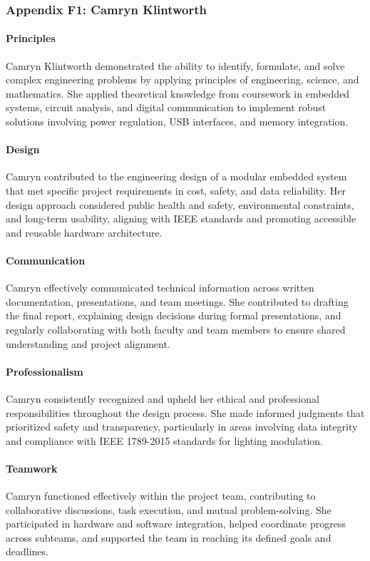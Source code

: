 \documentclass[../../main.tex]{subfiles}
\begin{document}
\subsubsection{Appendix F1: Camryn Klintworth}

\paragraph{Principles}
Camryn Klintworth demonstrated the ability to identify, formulate, and solve complex engineering problems by applying principles of engineering, science, and mathematics. She applied theoretical knowledge from coursework in embedded systems, circuit analysis, and digital communication to implement robust solutions involving power regulation, USB interfaces, and memory integration.

\paragraph{Design}
Camryn contributed to the engineering design of a modular embedded system that met specific project requirements in cost, safety, and data reliability. Her design approach considered public health and safety, environmental constraints, and long-term usability, aligning with IEEE standards and promoting accessible and reusable hardware architecture.

\paragraph{Communication}
Camryn effectively communicated technical information across written documentation, presentations, and team meetings. She contributed to drafting the final report, explaining design decisions during formal presentations, and regularly collaborating with both faculty and team members to ensure shared understanding and project alignment.

\paragraph{Professionalism}
Camryn consistently recognized and upheld her ethical and professional responsibilities throughout the design process. She made informed judgments that prioritized safety and transparency, particularly in areas involving data integrity and compliance with IEEE 1789-2015 standards for lighting modulation.

\paragraph{Teamwork}
Camryn functioned effectively within the project team, contributing to collaborative discussions, task execution, and mutual problem-solving. She participated in hardware and software integration, helped coordinate progress across subteams, and supported the team in reaching its defined goals and deadlines.
\end{document}
